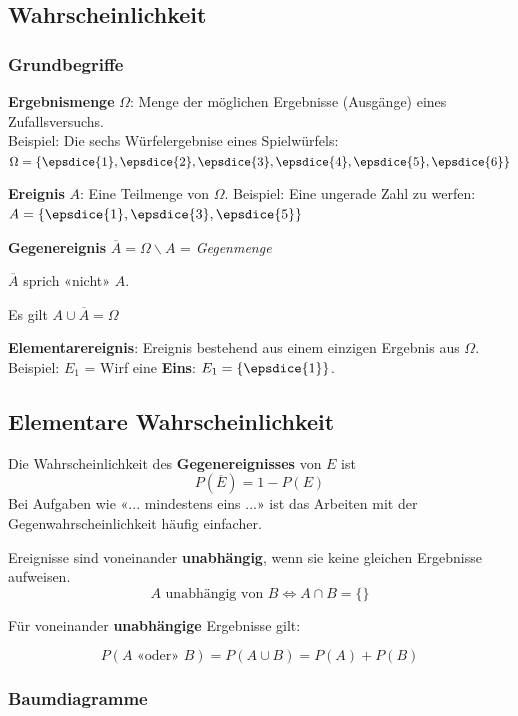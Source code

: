 \hrulefill



\begin{multicols}{2}


\subsection*{Wahrscheinlichkeit}
\subsubsection*{Grundbegriffe}

\textbf{Ergebnismenge} $\Omega$: Menge der möglichen Ergebnisse
(Ausgänge) eines Zufallsversuchs.\\
Beispiel: Die sechs Würfelergebnise
eines Spielwürfels: $\Omega = \{\epsdice{1}, \epsdice{2}, \epsdice{3}, \epsdice{4}, \epsdice{5}, \epsdice{6}\}$

\textbf{Ereignis} $A$: Eine Teilmenge von $\Omega$. Beispiel: Eine
ungerade Zahl zu werfen: $A  = \{\epsdice{1}, \epsdice{3}, \epsdice{5}\}$

\textbf{Gegenereignis} $\overline{A} = \Omega \backslash A$ =
\textit{Gegenmenge}

$\overline{A}$ sprich «nicht» $A$.

Es gilt $A \cup \overline{A} = \Omega$

\textbf{Elementarereignis}: Ereignis bestehend aus einem einzigen
Ergebnis aus $\Omega$. Beispiel: $E_1$ = Wirf eine \textbf{Eins}: $E_1
= \{\epsdice{1}\}$.


\subsection*{Elementare Wahrscheinlichkeit}
Die Wahrscheinlichkeit des \textbf{Gegenereignisses} von $E$ ist
$$P(\overline{E}) = 1- P(E)$$
Bei Aufgaben wie «... mindestens eins ...» ist das Arbeiten mit der
Gegenwahrscheinlichkeit häufig einfacher.

Ereignisse sind voneinander \textbf{unabhängig}, wenn sie keine
gleichen Ergebnisse aufweisen.
$$A \textrm{ unabhängig von } B \Leftrightarrow A\cap B=\{\}$$

Für voneinander \textbf{unabhängige} Ergebnisse 
gilt:

$$P(A\textrm{ «oder» }B) = P(A\cup B) = P(A) + P(B)$$


\subsubsection*{Baumdiagramme}


\end{multicols}
